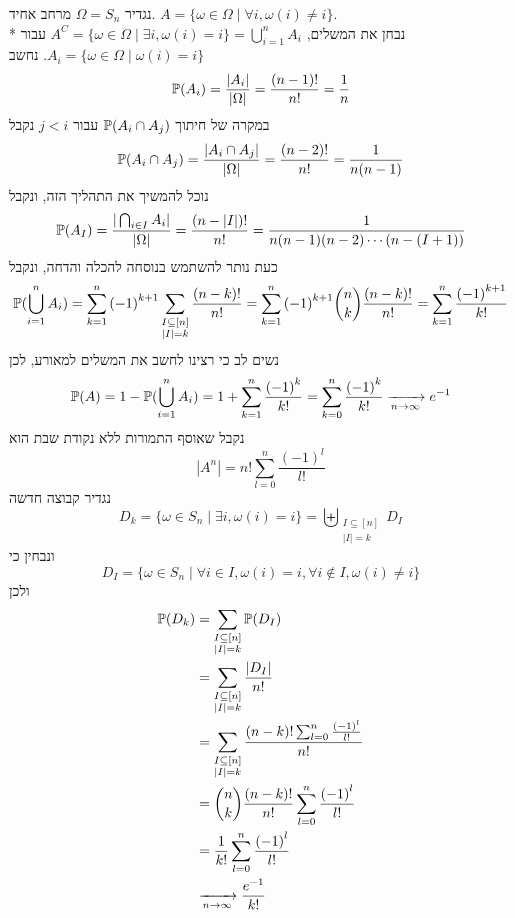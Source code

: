 \begin{solution}
	נגדיר $\Omega = S_n$ מרחב אחיד.
	$A = \{ \omega \in \Omega \mid \forall i, \omega(i) \ne i \}$. \\*
	נבחן את המשלים, $A^C = \{ \omega \in \Omega \mid \exists i, \omega(i) = i \} = \bigcup_{i = 1}^n A_i$ עבור $A_i = \{ \omega \in \Omega \mid \omega(i) = i \}$.
	נחשב
	\[
		\mathbb{P}(A_i) = \frac{|A_i|}{|\Omega|} = \frac{(n - 1)!}{n!} = \frac{1}{n}
	\]
	במקרה של חיתוך $\mathbb{P}(A_i \cap A_j)$ עבור $j < i$ נקבל
	\[
		\mathbb{P}(A_i \cap A_j) = \frac{|A_i \cap A_j|}{|\Omega|} = \frac{(n - 2)!}{n!} = \frac{1}{n(n - 1)}
	\]
	נוכל להמשיך את התהליך הזה, ונקבל
	\[
		\mathbb{P}(A_I) = \frac{|\bigcap_{i \in I} A_i|}{|\Omega|}
		= \frac{(n - |I|)!}{n!}
		= \frac{1}{n (n - 1) (n - 2) \cdots (n - (I + 1))}
	\]
	כעת נותר להשתמש בנוסחה להכלה והדחה, ונקבל
	\[
		\mathbb{P}(\bigcup_{i = 1}^n A_i)
		= \sum_{k = 1}^{n} {(-1)}^{k + 1} \sum_{\substack{I \subseteq [n] \\ |I| = k}} \frac{(n - k)!}{n!}
		= \sum_{k = 1}^{n} {(-1)}^{k + 1} \binom{n}{k} \frac{(n - k)!}{n!}
		= \sum_{k = 1}^{n} \frac{{(-1)}^{k + 1}}{k!}
	\]
	נשים לב כי רצינו לחשב את המשלים למאורע, לכן
	\[
		\mathbb{P}(A)
		= 1 - \mathbb{P}(\bigcup_{i = 1}^n A_i)
		= 1 + \sum_{k = 1}^{n} \frac{{(-1)}^k}{k!}
		= \sum_{k = 0}^{n} \frac{{(-1)}^k}{k!}
		\xrightarrow[n \to \infty]{} e^{-1}
	\]
	נקבל שאוסף התמורות ללא נקודת שבת הוא
	\[
		|A^n| = n! \sum_{l = 0}^{n} \frac{{(-1)}^l}{l!}
	\]
	נגדיר קבוצה חדשה
	\[
		D_k = \{ \omega \in S_n \mid \exists i, \omega(i) = i \}
		= \biguplus_{\substack{I \subseteq [n] \\ |I| = k }} D_I
	\]
	ונבחין כי
	\[
		D_I = \{ \omega \in S_n \mid \forall i \in I, \omega(i) = i, \forall i \notin I, \omega(i) \ne i \}
	\]
	ולכן
	\begin{align*}
		\mathbb{P}(D_k)
		& = \sum_{\substack{I \subseteq [n] \\ |I| = k }} \mathbb{P}(D_I) \\
		& = \sum_{\substack{I \subseteq [n] \\ |I| = k }} \frac{|D_I|}{n!} \\
		& = \sum_{\substack{I \subseteq [n] \\ |I| = k }} \frac{(n - k)! \sum_{l = 0}^n \frac{{(-1)}^l}{l!}}{n!} \\
		& = \binom{n}{k} \frac{(n - k)!}{n!} \sum_{l = 0}^n \frac{{(-1)}^l}{l!} \\
		& = \frac{1}{k!} \sum_{l = 0}^n \frac{{(-1)}^l}{l!} \\
		& \xrightarrow[n \to \infty]{} \frac{e^{-1}}{k!}
	\end{align*}
\end{solution}

